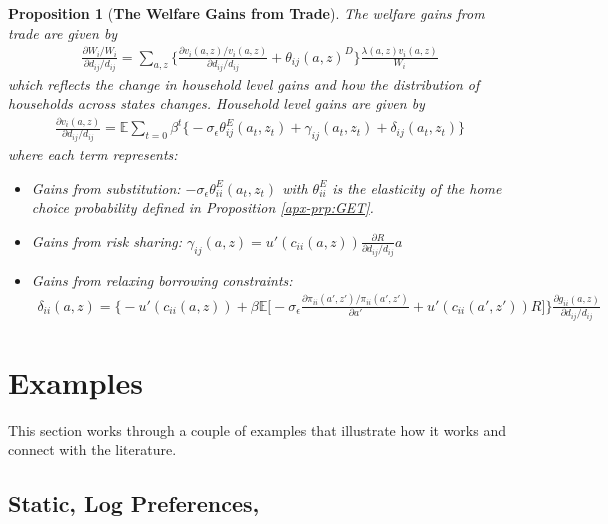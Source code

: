 \documentclass[12pt,pdftex]{article}
\newtheorem{prp}{Proposition}
\begin{document}
\begin{onehalfspacing}
\begin{prp}[\textbf{The Welfare Gains from Trade}] \label{apx-prp:gains-trade} The welfare gains from trade are given by
{\footnotesize
\begin{align}
\frac{\partial W_{i} / W_{i}}{\partial d_{ij} / d_{ij}} = \sum_{a,z} \bigg \{ \frac{\partial v_i(a, z) / v_{i}(a, z)}{\partial d_{ij} / d_{ij}}  +  \theta_{ij}(a,z)^{D} \bigg \} \frac{\lambda(a,z)v_{i}(a,z)}{W_{i}}
\label{eq:apx-social-welfare}
\end{align}
}
which reflects the change in household level gains and how the distribution of households across states changes. Household level gains are given by
{\footnotesize
\begin{align}
\nonumber
\frac{\partial v_i(a, z)}{\partial d_{ij} / d_{ij}} = \mathbb{E} \sum_{t = 0} \beta^{t} \bigg \{ -\sigma_{\epsilon} \theta^{E}_{ij}(a_{t},z_{t}) + \gamma_{ij}(a_{t},z_{t}) + \delta_{ij}(a_{t},z_{t}) \bigg \}
\end{align}
}where each term represents:
\begin{itemize}
\item Gains from substitution: $-\sigma_{\epsilon} \theta^{E}_{ii}(a_{t},z_{t})$ with $\theta^{E}_{ii}$ is the elasticity of the home choice probability defined in Proposition \ref{apx-prp:GET}.

\item Gains from risk sharing: $\gamma_{ij}(a,z) = u'(c_{ii}(a,z))\frac{\partial R}{\partial d_{ij} / d_{ij}}a$

\item Gains from relaxing borrowing constraints:
\begin{align}
\nonumber
\delta_{ii}(a,z) = \bigg \{- u'(c_{ii}(a,z)) + \beta \mathbb{E} \bigg [-\sigma_{\epsilon} \frac{\partial \pi_{ii}(a',z') / \pi_{ii}(a',z')}{\partial a'} + u'(c_{ii}(a',z'))R \bigg ] \bigg \}\frac{\partial g_{ii}(a,z)}{\partial d_{ij} / d_{ij}}
\end{align}
\end{itemize}
\end{prp}

\section{Examples}

This section works through a couple of examples that illustrate how it works and connect with the literature.

\subsection{Static, Log Preferences, \citet{arkolakis2012new}}


\end{onehalfspacing}
\end{document}
